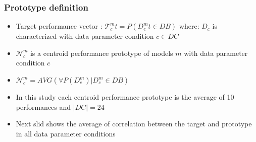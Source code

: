 \documentclass{beamer}
\begin{document}
\begin{frame}\frametitle{Prototype definition}
\begin{itemize}
\item Target performance vector : $\mathcal{T}_c^mt = P(D_c^mt \in DB)$ where: \newline $D_c$ is characterized with data parameter condition $c \in DC$  \pause
\item $\mathcal{N}_c^m$ is a centroid performance prototype of models $m$ with data parameter condition  $c$\pause
\item $\mathcal{N}_c^m = AVG(\forall P(D_c^m) | D_c^m \in DB)$ \pause%
\item In this study each centroid performance prototype is the average of 10 performances and $|DC|=24$ \pause
\item Next slid shows the average of correlation between the target and prototype in all data parameter conditions
\end{itemize}
\end{frame}
\end{document}
